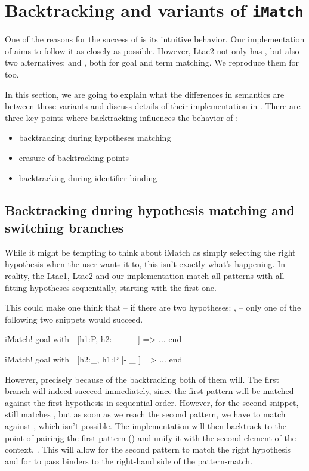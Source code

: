 \section{Backtracking and variants of \texttt{iMatch}}

One of the reasons for the success of  is its intuitive behavior.
Our implementation of  aims to follow it as closely as possible.
However, Ltac2 not only has , but also two alternatives:  and , both for goal and term matching.
We reproduce them for  too.

In this section, we are going to explain what the differences in semantics are between those variants and discuss details of their implementation in .
There are three key points where backtracking influences the behavior of :

\begin{minipage}{1.0\linewidth}
\begin{itemize}
\item backtracking during hypotheses matching
\item erasure of backtracking points
\item backtracking during identifier binding
\end{itemize}
\end{minipage}

\subsection{Backtracking during hypothesis matching and switching branches}

While it might be tempting to think about iMatch as simply selecting the right hypothesis when the user wants it to, this isn't exactly what's happening.
In reality, the Ltac1, Ltac2 and our implementation match all patterns with all fitting hypotheses sequentially, starting with the first one.

This could make one think that -- if there are two hypotheses: ,  -- only one of the following two snippets would succeed.
\begin{coq}
  iMatch! goal with
  | [h1:P, h2:_ |- _ ] => ...
  end
\end{coq}
\begin{coq}
  iMatch! goal with
  | [h2:_, h1:P |- _ ] => ...
  end
\end{coq}

However, precisely because of the backtracking both of them will.
The first branch will indeed succeed immediately, since the first pattern will be matched against the first hypothesis in sequential order.
However, for the second snippet,  still matches \coqe{_}, but as soon as we reach the second pattern, we have to match  against , which isn't possible.
The implementation will then backtrack to the point of pairinjg the first pattern (\coqe{_}) and unify it with the second element of the context, .
This will allow for the second pattern to match the right hypothesis and for  to pass binders to the right-hand side of the pattern-match.

